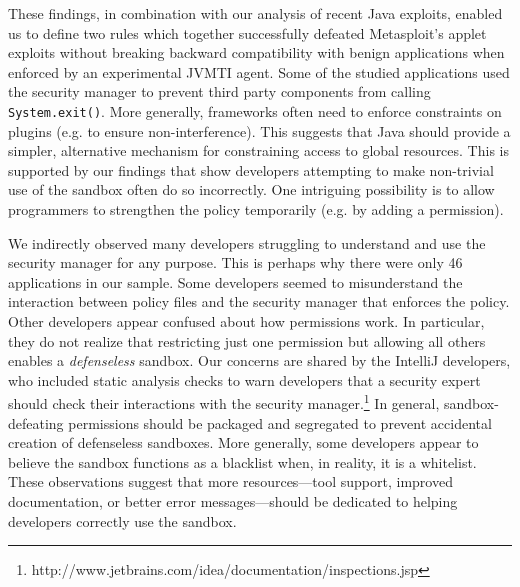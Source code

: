 \documentclass{sig-alternate}
\begin{document}
These findings, in combination with our analysis of recent Java exploits,
enabled us to define two rules which together successfully
defeated Metasploit's applet exploits without breaking backward compatibility with benign applications when enforced by an experimental JVMTI agent. Some of the studied applications
used the security manager to prevent third party components from calling
\texttt{System.exit()}. More generally, frameworks often need to enforce
constraints on plugins (e.g. to ensure non-interference). This suggests
that Java should provide a simpler, alternative mechanism for constraining
access to global resources. This is supported by our findings that
show developers attempting to make non-trivial use of the sandbox
often do so incorrectly. One intriguing possibility is to allow programmers
to strengthen the policy temporarily (e.g. by adding a permission). 

We indirectly observed many developers struggling to understand and
use the security manager for any purpose. This is perhaps why there
were only 46 applications in our sample. Some developers seemed to
misunderstand the interaction between policy files and the security
manager that enforces the policy. Other developers appear confused
about how permissions work. In particular, they do not realize that
restricting just one permission but allowing all others enables a
\emph{defenseless} sandbox. Our concerns are shared by the IntelliJ developers, who included static analysis checks to warn developers that a security expert should check their interactions with the security manager.\footnote{http://www.jetbrains.com/idea/documentation/inspections.jsp%
} In general, sandbox-defeating permissions
should be packaged and segregated to prevent accidental creation of
defenseless sandboxes. More generally, some developers appear to believe
the sandbox functions as a blacklist when, in reality, it is a whitelist.
These observations suggest that more resources---tool support, improved
documentation, or better error messages---should be dedicated to helping
developers correctly use the sandbox. 



\end{document}
